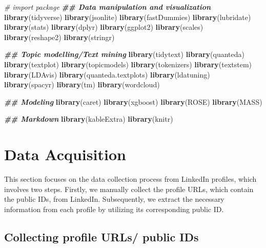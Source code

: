 \documentclass[11pt,]{article}
\newenvironment{Shaded}{\begin{snugshade}}{\end{snugshade}}
\newcommand{\CommentTok}[1]{\textcolor[rgb]{0.56,0.35,0.01}{\textit{#1}}}
\newcommand{\DocumentationTok}[1]{\textcolor[rgb]{0.56,0.35,0.01}{\textbf{\textit{#1}}}}
\newcommand{\FunctionTok}[1]{\textcolor[rgb]{0.13,0.29,0.53}{\textbf{#1}}}
\newcommand{\NormalTok}[1]{#1}
\begin{document}
\begin{Shaded}
\begin{Highlighting}[]
\CommentTok{\# import package}
\DocumentationTok{\#\# Data manipulation and visualization}
\FunctionTok{library}\NormalTok{(tidyverse)}
\FunctionTok{library}\NormalTok{(jsonlite)}
\FunctionTok{library}\NormalTok{(fastDummies)}
\FunctionTok{library}\NormalTok{(lubridate)}
\FunctionTok{library}\NormalTok{(stats)}
\FunctionTok{library}\NormalTok{(dplyr)}
\FunctionTok{library}\NormalTok{(ggplot2)}
\FunctionTok{library}\NormalTok{(scales)}
\FunctionTok{library}\NormalTok{(reshape2)}
\FunctionTok{library}\NormalTok{(stringr)}

\DocumentationTok{\#\# Topic modelling/Text mining }
\FunctionTok{library}\NormalTok{(tidytext)}
\FunctionTok{library}\NormalTok{(quanteda)}
\FunctionTok{library}\NormalTok{(textplot)}
\FunctionTok{library}\NormalTok{(topicmodels)}
\FunctionTok{library}\NormalTok{(tokenizers)}
\FunctionTok{library}\NormalTok{(textstem)}
\FunctionTok{library}\NormalTok{(LDAvis)}
\FunctionTok{library}\NormalTok{(quanteda.textplots)}
\FunctionTok{library}\NormalTok{(ldatuning)}
\FunctionTok{library}\NormalTok{(spacyr)}
\FunctionTok{library}\NormalTok{(tm)}
\FunctionTok{library}\NormalTok{(wordcloud)}

\DocumentationTok{\#\# Modeling}
\FunctionTok{library}\NormalTok{(caret)}
\FunctionTok{library}\NormalTok{(xgboost)}
\FunctionTok{library}\NormalTok{(ROSE)}
\FunctionTok{library}\NormalTok{(MASS)}

\DocumentationTok{\#\# Markdown }
\FunctionTok{library}\NormalTok{(kableExtra)}
\FunctionTok{library}\NormalTok{(knitr)   }
\end{Highlighting}
\end{Shaded}

\hypertarget{data-acquisition}{%
\section{Data Acquisition}\label{data-acquisition}}

This section focuses on the data collection process from LinkedIn
profiles, which involves two steps. Firstly, we manually collect the
profile URLs, which contain the public IDs, from LinkedIn. Subsequently,
we extract the necessary information from each profile by utilizing its
corresponding public ID.

\hypertarget{collecting-profile-urls-public-ids}{%
\subsection{Collecting profile URLs/ public
IDs}\label{collecting-profile-urls-public-ids}}
\end{document}
